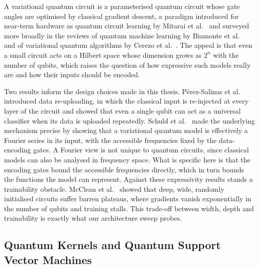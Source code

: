 A variational quantum circuit is a parameterised quantum circuit whose gate angles
are optimised by classical gradient descent, a paradigm introduced for near-term
hardware as quantum circuit learning by Mitarai et al.~\cite{mitarai2018qcl} and
surveyed more broadly in the reviews of quantum machine learning by Biamonte et
al.~\cite{biamonte2017qml} and of variational quantum algorithms by Cerezo et
al.~\cite{cerezo2021vqa}. The appeal is that even a small circuit acts on a Hilbert space whose dimension grows
as $2^n$ with the number of qubits, which raises the question of how expressive such
models really are and how their inputs should be encoded.

Two results inform the design choices made in this thesis. P{\'e}rez-Salinas et
al.~\cite{perezsalinas2020reuploading} introduced data re-uploading, in which the
classical input is re-injected at every layer of the circuit and showed that even a
single qubit can act as a universal classifier when its data is uploaded repeatedly.
Schuld et al.~\cite{schuld2021encoding} made the underlying mechanism precise by
showing that a variational quantum model is effectively a Fourier series in its
input, with the accessible frequencies fixed by the data-encoding gates. A Fourier
view is not unique to quantum circuits, since classical models can also be analysed in
frequency space. What is specific here is that the encoding gates bound the accessible
frequencies directly, which in turn bounds the functions the model can represent. Against
these expressivity results stands a trainability obstacle. McClean et
al.~\cite{mcclean2018barren} showed that deep, wide, randomly initialised circuits
suffer barren plateaus, where gradients vanish exponentially in the number of qubits
and training stalls. This trade-off between width, depth and trainability is exactly
what our architecture sweep probes.

\subsection{Quantum Kernels and Quantum Support Vector Machines}
\label{sec:rel_qsvm}

